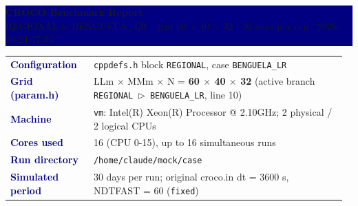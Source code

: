 \documentclass[10pt,a4paper]{article}
\begin{document}
\noindent\colorbox{navy}{\parbox{\dimexpr\linewidth-2\fboxsep}{\vspace{8pt}
{\color{white}\LARGE\bfseries CROCO Benchmark Report}\\[4pt]
{\color{white!80!accent}\small REGIONAL $\triangleright$ BENGUELA\_LR  $\cdot$  grid 60 $\times$ 40 $\times$ 32  $\cdot$  30 days per run  $\cdot$  2026-10-24 17:35}\vspace{6pt}}}
\par\noindent{\color{accent}\rule{\linewidth}{2pt}}\par\medskip
{\small\noindent\begin{tabular}{@{}p{0.24\linewidth}p{0.73\linewidth}@{}}
\textbf{\textcolor{navy}{Configuration}} & \texttt{cppdefs.h} block \texttt{REGIONAL}, case \texttt{BENGUELA\_LR} \\[1pt]
\textbf{\textcolor{navy}{Grid (param.h)}} & LLm $\times$ MMm $\times$ N = \textbf{60 $\times$ 40 $\times$ 32} (active branch \texttt{REGIONAL $\triangleright$ BENGUELA\_LR}, line 10) \\[1pt]
\textbf{\textcolor{navy}{Machine}} & \texttt{vm}: Intel(R) Xeon(R) Processor @ 2.10GHz; 2 physical / 2 logical CPUs \\[1pt]
\textbf{\textcolor{navy}{Cores used}} & 16 (CPU 0-15), up to 16 simultaneous runs \\[1pt]
\textbf{\textcolor{navy}{Run directory}} & \texttt{/home/claude/mock/case} \\[1pt]
\textbf{\textcolor{navy}{Simulated period}} & 30 days per run; original croco.in dt = 3600 s, NDTFAST = 60 (\texttt{fixed}) \\[1pt]
\end{tabular}}\par\medskip
\end{document}
